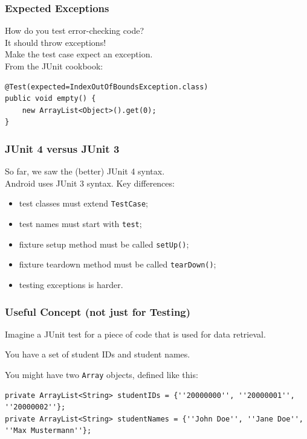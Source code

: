 \begin{frame}[fragile]
\frametitle{Expected Exceptions}

\begin{changemargin}{1cm}
How do you test error-checking code?\\[1em]

\pause
It should throw exceptions!\\[1em]

Make the test case expect an exception.\\[1em]
From the JUnit cookbook:
\end{changemargin}

\begin{lstlisting}
@Test(expected=IndexOutOfBoundsException.class) 
public void empty() { 
    new ArrayList<Object>().get(0); 
}
\end{lstlisting}

\end{frame}

\begin{frame}
\frametitle{JUnit 4 versus JUnit 3}

\begin{changemargin}{1.5cm}
So far, we saw the (better) JUnit 4 syntax.\\[1em]

Android uses JUnit 3 syntax. Key differences:

\begin{itemize}
\item test classes must extend {\tt TestCase};
\item test names must start with {\tt test};
\item fixture setup method must be called {\tt setUp()};
\item fixture teardown method must be called {\tt tearDown()};
\item testing exceptions is harder.
\end{itemize}

\end{changemargin}
\end{frame}


\begin{frame}[fragile]
\frametitle{Useful Concept (not just for Testing)}

\begin{changemargin}{1.5cm}

Imagine a JUnit test for a piece of code that is used for data retrieval. 

You have a set of student IDs and student names. 

You might have two \texttt{Array} objects, defined like this:

{\tiny
\begin{verbatim}
private ArrayList<String> studentIDs = {''20000000'', ''20000001'', ''20000002''};
private ArrayList<String> studentNames = {''John Doe'', ''Jane Doe'', ''Max Mustermann''};
\end{verbatim}
}


\end{changemargin}
\end{frame}

